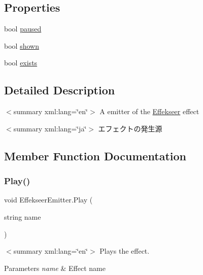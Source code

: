 \subsection*{Properties}
\begin{DoxyCompactItemize}
\item 
bool \hyperlink{class_effekseer_emitter_a5979b4e756a1f31e439752de6fb86c64}{paused}
\item 
bool \hyperlink{class_effekseer_emitter_a8beed88f3cb7357c4eb088847a6d1fbc}{shown}
\item 
bool \hyperlink{class_effekseer_emitter_aa4b49f6d532b7e75f2d207866ecee574}{exists}
\end{DoxyCompactItemize}


\subsection{Detailed Description}
$<$summary xml\+:lang=\char`\"{}en\char`\"{}$>$ A emitter of the \hyperlink{namespace_effekseer}{Effekseer} effect 

$<$summary xml\+:lang=\char`\"{}ja\char`\"{}$>$ エフェクトの発生源 

\subsection{Member Function Documentation}
\mbox{\label{class_effekseer_emitter_a8ae6fd4f46274d56eee5de6b1de3ee9b}} 
\subsubsection{\texorpdfstring{Play()}{Play()}\hspace{0.1cm}{\footnotesize\ttfamily [1/2]}}
{\footnotesize\ttfamily void Effekseer\+Emitter.\+Play (\begin{DoxyParamCaption}\item[{string}]{name }\end{DoxyParamCaption})\hspace{0.3cm}{\ttfamily [inline]}}

$<$summary xml\+:lang=\char`\"{}en\char`\"{}$>$ Plays the effect. 
\begin{DoxyParams}{Parameters}
{\em name} & Effect name\\
\hline
\end{DoxyParams}



